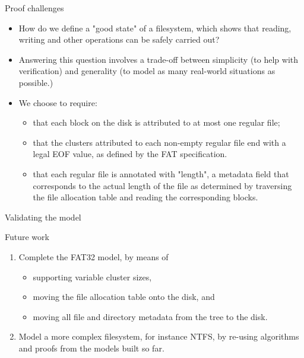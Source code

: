 \documentclass{beamer}
\begin{document}
\begin{frame}{Proof challenges}
  \begin{itemize}
  \item How do we define a "good state" of a filesystem, which shows
    that reading, writing and other operations can be safely carried
    out?
  \item Answering this question involves a trade-off between
    simplicity (to help with verification) and generality (to model as
    many real-world situations as possible.)
  \item We choose to require:
    \begin{itemize}
    \item that each block on the disk is attributed to at most one
      regular file;
    \item that the clusters attributed to each non-empty regular file
      end with a legal EOF value, as defined by the FAT specification.
    \item that each regular file is annotated with "length", a
      metadata field that corresponds to the actual length of the file
      as determined by traversing the file allocation table and
      reading the corresponding blocks.
    \end{itemize}
  \end{itemize}
\end{frame}

\begin{frame}{Validating the model}
\end{frame}

\begin{frame}{Future work}
  \begin{enumerate}
  \item Complete the FAT32 model, by means of
    \begin{itemize}
    \item supporting variable cluster sizes,
    \item moving the file allocation table onto the disk, and
    \item moving all file and directory metadata from the tree to the
      disk.
    \end{itemize}
  \item Model a more complex filesystem, for instance NTFS, by
    re-using algorithms and proofs from the models built so far.
  \end{enumerate}
\end{frame}
\end{document}
